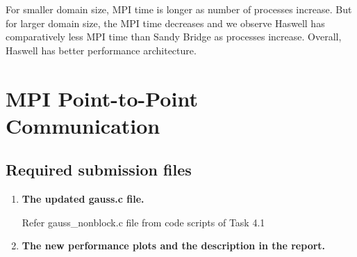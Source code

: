 \documentclass[10pt, letterpaper, twoside]{article}
\begin{document}
\begin{titlepage}
\begin{enumerate}
For smaller domain size, MPI time is longer as number of processes increase. But for larger domain size, the MPI time decreases and we observe Haswell has comparatively less MPI time than Sandy Bridge as processes increase. Overall, Haswell has better performance architecture. 

\end{enumerate}

\section{MPI Point-to-Point Communication}

\subsection{Required submission files}

\begin{enumerate}
\item \textbf{The updated gauss.c file.} 

Refer gauss\_nonblock.c file from code scripts of Task 4.1   

\item \textbf{The new performance plots and the description in the report.} 


\end{enumerate}
\end{titlepage}
\end{document}
